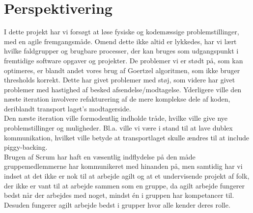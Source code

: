 \section{Perspektivering}
I dette projekt har vi forsøgt at løse fysiske og kodemæssige problemstillinger, med en agile fremgangsmåde. Omend dette ikke altid er lykkedes, har vi lært hvilke faldgrupper og brugbare processer, der kan bruges som udgangspunkt i fremtidige software opgaver og projekter.
\newline
De problemer vi er stødt på, som kan optimeres, er blandt andet vores brug af Goertzel algoritmen, som ikke bruger thresholds korrekt. Dette har givet problemer med støj, som videre har givet problemer med hastighed af besked afsendelse/modtagelse. Yderligere ville den næste iteration involvere refakturering af de mere komplekse dele af koden, deriblandt transport laget's modtagerside.
\\
Den næste iteration ville formodentlig indholde tråde, hvilke ville give nye problemstillinger og muligheder. Bl.a. ville vi være i stand til at lave dublex kommunikation, hvilket ville betyde at transportlaget skulle ændres til at include piggy-backing.
\\
Brugen af Scrum har haft en væsentlig indflydelse på den måde gruppemedlemmerne har kommunikeret med hinanden på, men samtidig har vi indset at det ikke er nok til at arbejde agilt og at et undervisende projekt af folk, der ikke er vant til at arbejde sammen som en gruppe, da agilt arbejde fungerer bedst når der arbejdes med noget, mindst én i gruppen har kompetancer til. Desuden fungerer agilt arbejde bedst i grupper hvor alle kender deres rolle.


